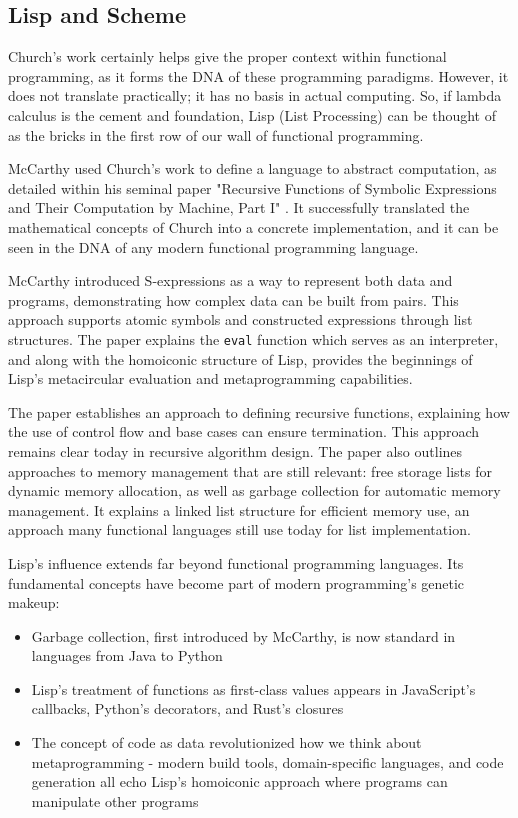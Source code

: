 \documentclass[final]{cmpreport_02}
\begin{document}
\subsection{Lisp and Scheme}

Church's work certainly helps give the proper context within functional programming, as it forms the DNA of these programming paradigms. However, it does not translate practically; it has no basis in actual computing. So, if lambda calculus is the cement and foundation, Lisp (List Processing) can be thought of as the bricks in the first row of our wall of functional programming.

McCarthy used Church's work to define a language to abstract computation, as detailed within his seminal paper "Recursive Functions of Symbolic Expressions and Their Computation by Machine, Part I" \cite{mccarthy1960recursive}. It successfully translated the mathematical concepts of Church into a concrete implementation, and it can be seen in the DNA of any modern functional programming language.

McCarthy introduced S-expressions as a way to represent both data and programs, demonstrating how complex data can be built from pairs. This approach supports atomic symbols and constructed expressions through list structures. The paper explains the \texttt{eval} function which serves as an interpreter, and along with the homoiconic structure of Lisp, provides the beginnings of Lisp's metacircular evaluation and metaprogramming capabilities.

The paper establishes an approach to defining recursive functions, explaining how the use of control flow and base cases can ensure termination. This approach remains clear today in recursive algorithm design. The paper also outlines approaches to memory management that are still relevant: free storage lists for dynamic memory allocation, as well as garbage collection for automatic memory management. It explains a linked list structure for efficient memory use, an approach many functional languages still use today for list implementation.

Lisp's influence extends far beyond functional programming languages. Its fundamental concepts have become part of modern programming's genetic makeup:
\begin{itemize}
    \item Garbage collection, first introduced by McCarthy, is now standard in languages from Java to Python
    \item Lisp's treatment of functions as first-class values appears in JavaScript's callbacks, Python's decorators, and Rust's closures
    \item The concept of code as data revolutionized how we think about metaprogramming - modern build tools, domain-specific languages, and code generation all echo Lisp's homoiconic approach where programs can manipulate other programs
\end{itemize}
\end{document}
